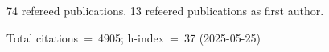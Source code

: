 74 refereed publications. 13 refeered publications as first author.

Total citations~=~4905; h-index~=~37 (2025-05-25)